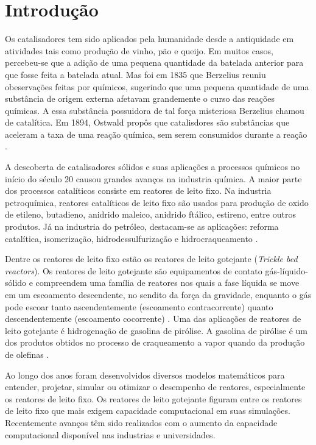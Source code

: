 %
% 
%
\chapter{Introdução} \label{chap:introduction}


Os catalisadores tem sido aplicados pela humanidade desde a antiquidade
em atividades tais como produção de vinho, pão e queijo. Em muitos
casos, percebeu-se que a adição de uma pequena quantidade da batelada anterior
para que fosse feita a batelada atual. Mas foi em 1835 que Berzelius reuniu
obeservações feitas por químicos, sugerindo que uma pequena quantidade de
uma substância de origem externa afetavam grandemente o
curso das reações químicas. A essa substância possuidora de tal força
misteriosa Berzelius chamou de catalítica. Em 1894, Ostwald propôs que
catalisdores são substâncias que aceleram a taxa de uma reação química, sem
serem consumidos durante a reação \cite{Oyama1988}.

A descoberta de catalisadores sólidos e suas aplicações a processos químicos no
início do século 20 causou grandes avanços na industria química. A maior parte
dos processos catalíticos consiste em reatores de leito fixo. Na industria
petroquímica, reatores catalíticos de leito fixo são usados para produção de
oxido de etileno, butadieno, anidrido maleico, anidrido ftálico, estireno,
entre outros produtos. Já na industria do petróleo, destacam-se as aplicações:
reforma catalítica, isomerização, hidrodessulfurização e hidrocraqueamento
\cite{Froment2011}.

Dentre os reatores de leito fixo estão os reatores de leito gotejante
(\emph{Trickle bed reactors}). Os reatores de leito gotejante são
equipamentos de contato gás-líquido-sólido e compreendem uma família de
reatores nos quais a fase líquida se move em um escoamento descendente, no
sendito da força da gravidade, enquanto o gás pode escoar tanto ascendentemente
(escoamento contracorrente) quanto descendentemente (escoamento cocorrente)
\cite{Ranade2011}. Uma das aplicações de reatores de leito gotejante é
hidrogenação de gasolina de pirólise. A gasolina de pirólise é um dos produtos obtidos no processo de
craqueamento a vapor quando da produção de olefinas \cite{Cheng1986}.

Ao longo dos anos foram desenvolvidos diversos modelos matemáticos para
entender, projetar, simular ou otimizar o desempenho de reatores, especialmente
os reatores de leito fixo. Os reatores de leito gotejante figuram entre os
reatores de leito fixo que mais exigem capacidade computacional em suas
simulações. Recentemente avanços têm sido realizados com o aumento da capacidade
computacional disponível nas industrias e universidades.

